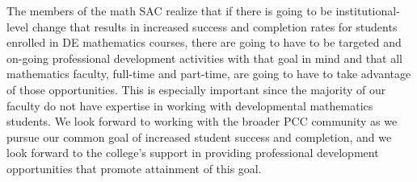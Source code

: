 The members of the math SAC realize that if there is going to be
institutional-level change that results in increased success and completion
rates for students enrolled in DE mathematics courses, there are going to have
to be targeted and on-going professional development activities with that goal
in mind and that all mathematics faculty, full-time and part-time, are going to
have to take advantage of those opportunities.  This is especially important
since the majority of our faculty do not have expertise in working with
developmental mathematics students. We look forward to working with the broader
PCC community as we pursue our common goal of increased student success and
completion, and we look forward to the college's support in providing
professional development opportunities that promote attainment of this goal.
